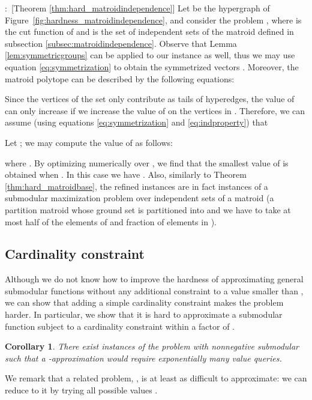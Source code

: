 \documentclass{article}[11pt]
\newtheorem{corollary}[theorem]{Corollary}
\renewenvironment{proof}{\noindent{\bf Proof}:~}{\\}
\begin{document}
\begin{proof}[Theorem \ref{thm:hard_matroidindependence}]
Let  be the hypergraph of Figure~\ref{fig:hardness_matroidindependence},
and consider the problem , where  is the cut function of 
and  is the set of independent sets of the matroid  defined in subsection
\ref{subsec:matroidindependence}. 
Observe that Lemma \ref{lem:symmetricgroups} can be applied to our instance  as well,
thus we may use equation \eqref{eq:symmetrization} to obtain the symmetrized
vectors .
Moreover, the matroid polytope can be described by the following equations:

Since the vertices of the set  only contribute as tails of hyperedges,
the value of  can only increase if we increase the value of  on
the vertices in . Therefore, we can assume (using equations \eqref{eq:symmetrization} and
\eqref{eq:indproperty}) that

Let ; we may compute the value of  as follows:

where .
By optimizing numerically over , we find that the smallest value of 
is obtained when . In this case we have . Also, similarly to Theorem \ref{thm:hard_matroidbase},
the refined instances are in fact instances of a submodular maximization 
problem over independent sets of a matroid (a partition matroid whose ground set
is partitioned into  and we have to take at most half of the elements of 
and  fraction of elements in ).
\end{proof}

\subsection{Cardinality constraint}

Although we do not know how to improve the hardness of approximating general submodular
functions without any additional constraint to a value smaller than , we can show
that adding a simple cardinality constraint makes the problem harder. In particular,
we show that it is hard to approximate a submodular function subject to a cardinality
constraint within a factor of . 

\begin{corollary}
There exist instances of the problem  with  nonnegative submodular
such that a -approximation would require exponentially many value queries.
\end{corollary} 

We remark that a related problem, , is at least as difficult
to approximate: we can reduce  to it by trying
all possible values .
\end{document}
